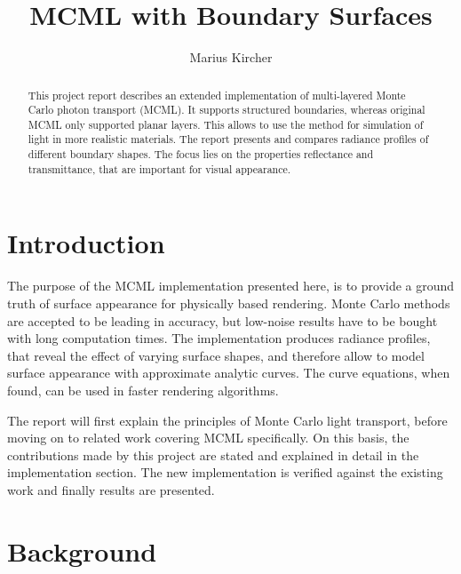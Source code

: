 \documentclass[]{article}
\title{MCML with Boundary Surfaces}
\author{Marius Kircher}
\begin{document}
\maketitle

\begin{abstract}
	This project report describes an extended implementation of multi-layered Monte Carlo photon transport\cite{wang1992monte} (MCML). It supports structured boundaries, whereas original MCML only supported planar layers. This allows to use the method for simulation of light in more realistic materials. The report presents and compares radiance profiles of different boundary shapes. The focus lies on the properties reflectance and transmittance, that are important for visual appearance.
\end{abstract}

\section{Introduction}

The purpose of the MCML implementation presented here, is to provide a ground truth of surface appearance for physically based rendering. Monte Carlo methods are accepted to be leading in accuracy, but low-noise results have to be bought with long computation times. The implementation produces radiance profiles, that reveal the effect of varying surface shapes, and therefore allow to model surface appearance with approximate analytic curves. The curve equations, when found, can be used in faster rendering algorithms.

The report will first explain the principles of Monte Carlo light transport, before moving on to related work covering MCML specifically. On this basis, the contributions made by this project are stated and explained in detail in the implementation section. The new implementation is verified against the existing work and finally results are presented.

\section{Background}
\end{document}
